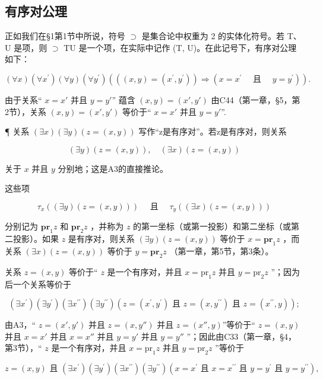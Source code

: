 \subsection{有序对公理}

正如我们在§1第1节中所说，符号 \(\supset\) 是集合论中权重为 2 的实体化符号。若 T、U 是项，则 \(\supset\) TU 是一个项，在实际中记作 (T, U)。在此记号下，有序对公理如下：

\[
(\forall x) (\forall x ^ {\prime}) (\forall y) (\forall y ^ {\prime}) (((x, y) = (x ^ {\prime}, y ^ {\prime})) \Longrightarrow (x = x ^ {\prime} \quad \text { 且 } \quad y = y ^ {\prime})). \tag {A3.}
\]

由于关系“ \(x = x'\) 并且 \(y = y'\)'' 蕴含 \((x, y) = (x', y')\) 由C44（第一章，§5，第2节），关系 \((x, y) = (x', y')\) 等价于“ \(x = x'\) 并且 \(y = y'\)''.

¶ 关系 \((\exists x)(\exists y)(z=(x,y))\) 写作“z是有序对”。若z是有序对，则关系

\[
(\exists y) (z = (x, y)), \quad (\exists x) (z = (x, y))
\]

关于 \(x\) 并且 \(y\) 分别地；这是A3的直接推论。

这些项

\[
\tau_ {x} ((\exists y) (z = (x, y))) \quad \text { 且 } \quad \tau_ {y} ((\exists x) (z = (x, y)))
\]

分别记为 \(\mathbf{pr}_1z\) 和 \(\mathbf{pr}_2z\) ，并称为 \(z\) 的第一坐标（或第一投影）和第二坐标（或第二投影）。如果 \(z\) 是有序对，则关系 \((\exists y)(z = (x, y))\) 等价于 \(x = \mathbf{pr}_1z\) ，而关系 \((\exists x)(z = (x, y))\) 等价于 \(y = \mathbf{pr}_2z\) （第一章，第5节，第3条）。

关系 \(z = (x, y)\) 等价于“ \(z\) 是一个有序对，并且 \(x = \text{pr}_1z\) 并且 \(y = \text{pr}_2z\) ''；因为后一个关系等价于

\[
(\exists x ^ {\prime}) (\exists y ^ {\prime}) (\exists x ^ {\prime \prime}) (\exists y ^ {\prime \prime}) (z = (x ^ {\prime}, y ^ {\prime}) \text {   且   } z = (x, y ^ {\prime \prime}) \text {   且   } z = (x ^ {\prime \prime}, y));
\]

由A3，“ \(z = (x', y')\) 并且 \(z = (x, y'')\) 并且 \(z = (x'', y)\)”等价于“ \(z = (x, y)\) 并且 \(x = x'\) 并且 \(x = x''\) 并且 \(y = y'\) 并且 \(y = y''\) ”；因此由C33（第一章，§4，第3节），“ \(z\) 是一个有序对，并且 \(x = \text{pr}_1 z\) 并且 \(y = \text{pr}_2 z\) ”等价于

\[
z = (x, y) \text { 且 } (\exists x ^ {\prime}) (\exists y ^ {\prime}) (\exists x ^ {\prime \prime}) (\exists y ^ {\prime \prime}) (x = x ^ {\prime} \text { 且 } x = x ^ {\prime \prime} \text { 且 } y = y ^ {\prime} \text { 且 } y = y ^ {\prime \prime}),
\]

